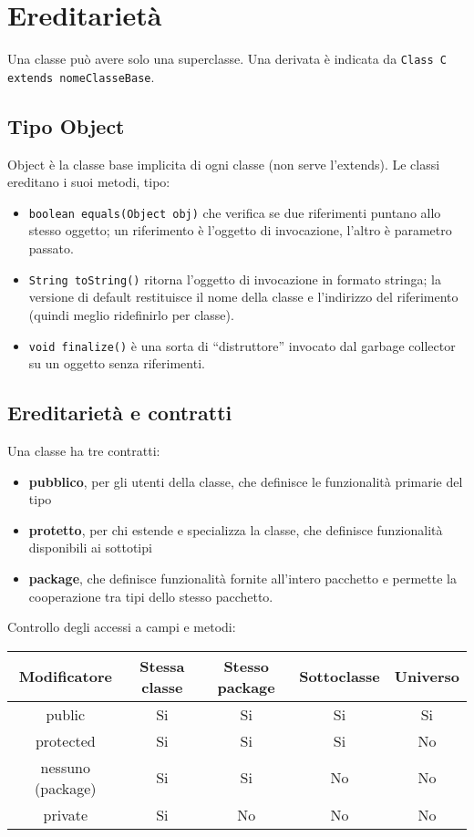 \chapter{Ereditarietà}

Una classe può avere solo una superclasse. Una derivata è indicata da \texttt{Class C extends nomeClasseBase{}}. 

\section{Tipo Object} %
Object è la classe base implicita di ogni classe (non serve l'extends). Le classi ereditano i suoi metodi, tipo:
\begin{itemize}
\item \texttt{boolean equals(Object obj)} che verifica se due riferimenti puntano allo stesso oggetto; un riferimento è l'oggetto di invocazione, l'altro è parametro passato. 
\item \texttt{String toString()} ritorna l'oggetto di invocazione in formato stringa; la versione di default restituisce il nome della classe e l'indirizzo del riferimento (quindi meglio ridefinirlo per classe).
\item \texttt{void finalize()} è una sorta di “distruttore” invocato dal garbage collector su un oggetto senza riferimenti.
\end{itemize}

\section{Ereditarietà e contratti} %
Una classe ha tre contratti:
\begin{itemize}
\item \textbf{pubblico}, per gli utenti della classe, che definisce le funzionalità primarie del tipo
\item \textbf{protetto}, per chi estende e specializza la classe, che definisce funzionalità disponibili ai sottotipi
\item \textbf{package}, che definisce funzionalità fornite all'intero pacchetto e permette la cooperazione tra tipi dello stesso pacchetto.
\end{itemize}
Controllo degli accessi a campi e metodi:
\begin{table}[h]
\begin{tabular}{|c|c|c|c|c|}
\hline
\textbf{Modificatore} & \textbf{Stessa classe} & \textbf{Stesso package} & \textbf{Sottoclasse} & \textbf{Universo} \\
\hline
public & Si & Si & Si & Si \\
\hline
protected & Si & Si & Si & No \\
\hline
nessuno (package) & Si & Si & No & No \\
\hline
private & Si & No & No & No \\
\hline
\end{tabular}
\end{table}

